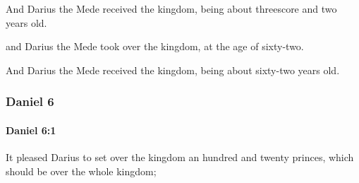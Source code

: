 			\begin{versebox}
					\item[BHS] 
					\item[LXX] 
					\item[ASV] And Darius the Mede received the kingdom, being about threescore and two years old.
					\item[NIV] and Darius the Mede took over the kingdom, at the age of sixty-two.
					\item[NRSV] And Darius the Mede received the kingdom, being about sixty-two years old.
			\end{versebox}
	\subsubsection{Daniel 6} %
		\label{DANIEL-6}

		\paragraph{Daniel 6:1} %
			\label{DANIEL-6-1}

			It pleased Darius to set over the kingdom an hundred and twenty princes, which should be over the whole kingdom;

